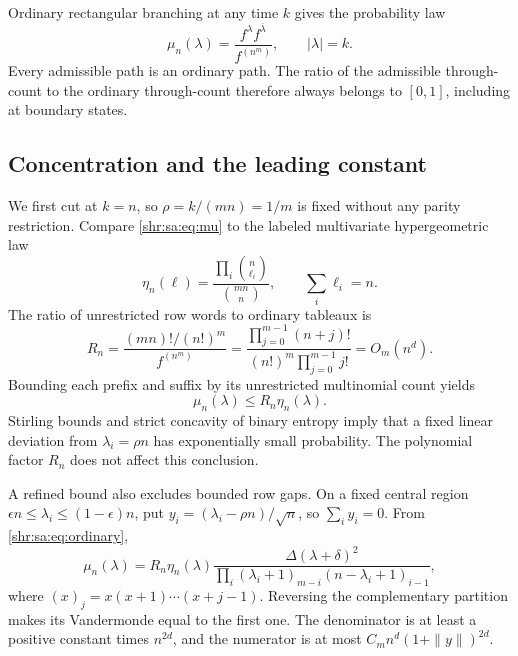 \documentclass[11pt,letterpaper]{article}
\numberwithin{equation}{section}
\theoremstyle{definition}
\newcommand{\1}{\mathbf 1}
\newcommand{\D}{\Delta}
\begin{document}
Ordinary rectangular branching at any time $k$ gives the probability law
\begin{equation}\label{shr:sa:eq:mu}
 \mu_n(\lambda)=\frac{f^\lambda f^{\bar\lambda}}{f^{(n^m)}},
 \qquad |\lambda|=k.
\end{equation}
Every admissible path is an ordinary path. The ratio of the admissible through-count to the ordinary through-count therefore always belongs to $[0,1]$, including at boundary states.

\subsection{Concentration and the leading constant}
We first cut at $k=n$, so $\rho=k/(mn)=1/m$ is fixed without any parity restriction. Compare \eqref{shr:sa:eq:mu} to the labeled multivariate hypergeometric law
\[
 \eta_n(\ell)=\frac{\prod_i\binom n{\ell_i}}{\binom{mn}n},
 \qquad \sum_i\ell_i=n.
\]
The ratio of unrestricted row words to ordinary tableaux is
\[
 R_n=\frac{(mn)!/(n!)^m}{f^{(n^m)}}
 =\frac{\prod_{j=0}^{m-1}(n+j)!}{(n!)^m\prod_{j=0}^{m-1}j!}
 =O_m(n^d).
\]
Bounding each prefix and suffix by its unrestricted multinomial count yields
\begin{equation}\label{shr:sa:eq:crude}
 \mu_n(\lambda)\le R_n\eta_n(\lambda).
\end{equation}
Stirling bounds and strict concavity of binary entropy imply that a fixed linear deviation from $\lambda_i=\rho n$ has exponentially small probability. The polynomial factor $R_n$ does not affect this conclusion.

A refined bound also excludes bounded row gaps. On a fixed central region
$\epsilon n\le\lambda_i\le(1-\epsilon)n$, put
$y_i=(\lambda_i-\rho n)/\sqrt n$, so $\sum_i y_i=0$. From \eqref{shr:sa:eq:ordinary},
\begin{equation}\label{shr:sa:eq:refined}
 \mu_n(\lambda)=R_n\eta_n(\lambda)
 \frac{\D(\lambda+\delta)^2}
 {\prod_i(\lambda_i+1)_{m-i}(n-\lambda_i+1)_{i-1}},
\end{equation}
where $(x)_j=x(x+1)\cdots(x+j-1)$. Reversing the complementary partition makes its Vandermonde equal to the first one. The denominator is at least a positive constant times $n^{2d}$, and the numerator is at most
$C_m n^d(1+\|y\|)^{2d}$.
\end{document}
